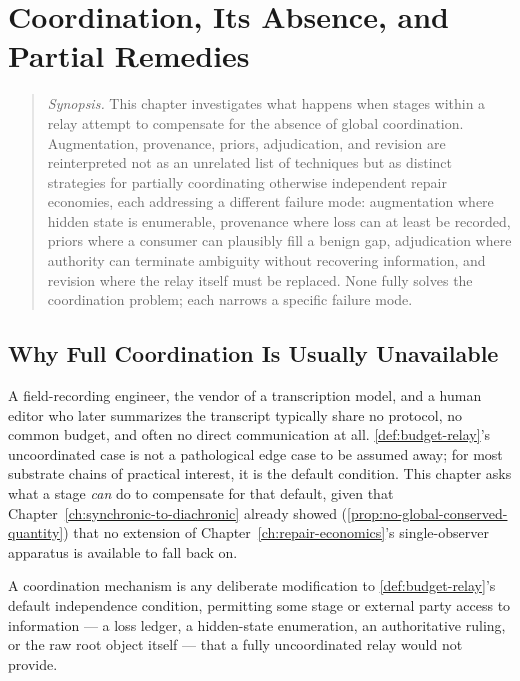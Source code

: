 \chapter{Coordination, Its Absence, and Partial Remedies}
\label{ch:coordination}

\begin{quotation}
\noindent\textit{Synopsis.} This chapter investigates what happens when
stages within a relay attempt to compensate for the absence of global
coordination. Augmentation, provenance, priors, adjudication, and revision
are reinterpreted not as an unrelated list of techniques but as distinct
strategies for partially coordinating otherwise independent repair
economies, each addressing a different failure mode: augmentation where
hidden state is enumerable, provenance where loss can at least be recorded,
priors where a consumer can plausibly fill a benign gap, adjudication where
authority can terminate ambiguity without recovering information, and
revision where the relay itself must be replaced. None fully solves the
coordination problem; each narrows a specific failure mode.
\end{quotation}

\section{Why Full Coordination Is Usually Unavailable}

A field-recording engineer, the vendor of a transcription model, and a
human editor who later summarizes the transcript typically share no
protocol, no common budget, and often no direct communication at all.
\cref{def:budget-relay}'s uncoordinated case is not a pathological edge
case to be assumed away; for most substrate chains of practical interest,
it is the default condition. This chapter asks what a stage \emph{can} do
to compensate for that default, given that Chapter~\ref{ch:synchronic-to-diachronic}
already showed (\cref{prop:no-global-conserved-quantity}) that no
extension of Chapter~\ref{ch:repair-economics}'s single-observer
apparatus is available to fall back on.

\begin{definition}
\label{def:coordination-mechanism}
A coordination mechanism is any deliberate modification to
\cref{def:budget-relay}'s default independence condition, permitting some
stage or external party access to information --- a loss ledger, a
hidden-state enumeration, an authoritative ruling, or the raw root object
itself --- that a fully uncoordinated relay would not provide.
\end{definition}

